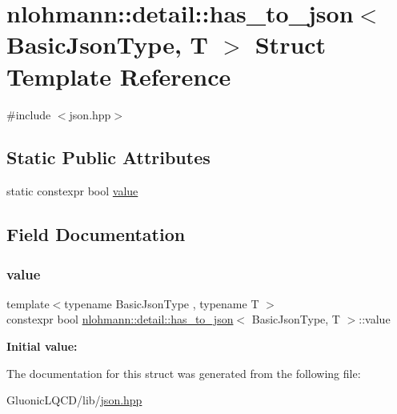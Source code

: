 \hypertarget{structnlohmann_1_1detail_1_1has__to__json}{}\section{nlohmann\+::detail\+::has\+\_\+to\+\_\+json$<$ Basic\+Json\+Type, T $>$ Struct Template Reference}
\label{structnlohmann_1_1detail_1_1has__to__json}


{\ttfamily \#include $<$json.\+hpp$>$}

\subsection*{Static Public Attributes}
\begin{DoxyCompactItemize}
\item 
static constexpr bool \mbox{\hyperlink{structnlohmann_1_1detail_1_1has__to__json_a18e260c3c6f10328637c4427d3cb3a31}{value}}
\end{DoxyCompactItemize}


\subsection{Field Documentation}
\mbox{\label{structnlohmann_1_1detail_1_1has__to__json_a18e260c3c6f10328637c4427d3cb3a31}} 
\subsubsection{\texorpdfstring{value}{value}}
{\footnotesize\ttfamily template$<$typename Basic\+Json\+Type , typename T $>$ \\
constexpr bool \mbox{\hyperlink{structnlohmann_1_1detail_1_1has__to__json}{nlohmann\+::detail\+::has\+\_\+to\+\_\+json}}$<$ Basic\+Json\+Type, T $>$\+::value\hspace{0.3cm}{\ttfamily [static]}}

{\bfseries Initial value\+:}
\begin{DoxyCode}{0}

\end{DoxyCode}


The documentation for this struct was generated from the following file\+:\begin{DoxyCompactItemize}
\item 
Gluonic\+L\+Q\+C\+D/lib/\mbox{\hyperlink{json_8hpp}{json.\+hpp}}\end{DoxyCompactItemize}
